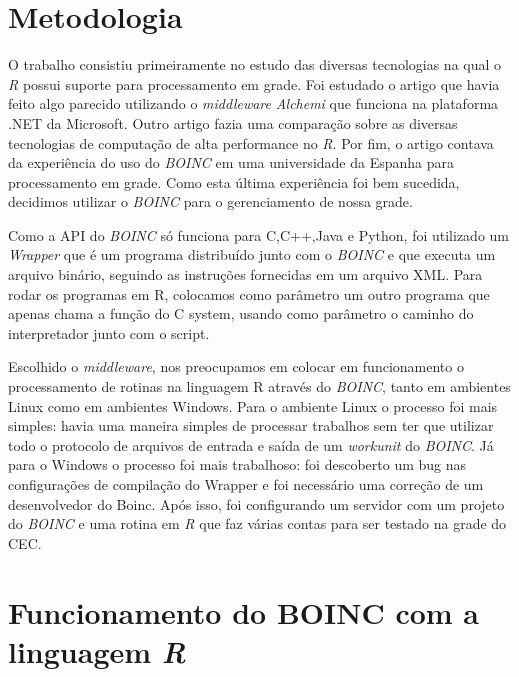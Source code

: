 \documentclass[b1,portrait]{sciposter}
\begin{document}
\begin{multicols}{2}
\section{Metodologia}

O trabalho consistiu primeiramente no estudo das diversas tecnologias na qual o \textit{R} possui suporte
para processamento em grade. Foi estudado o artigo \cite{Dias}
que havia feito algo parecido utilizando o \textit{middleware} \textit{Alchemi} que funciona na plataforma .NET
da Microsoft. Outro artigo \cite{epub8991}
fazia uma comparação sobre as diversas tecnologias de computação de alta performance no \textit{R}. Por fim, o artigo \cite{boinc}
contava da experiência do uso do \textit{BOINC} em uma universidade da Espanha para processamento em grade. Como
esta última experiência foi bem sucedida, decidimos utilizar o \textit{BOINC} para o gerenciamento de nossa grade.

Como a API do \textit{BOINC} só funciona para C,C++,Java e Python, foi utilizado um \textit{Wrapper} que é um programa distribuído junto com o 
\textit{BOINC} e que executa um arquivo binário, seguindo as instruções fornecidas em um arquivo XML. Para rodar os programas em R,
colocamos como parâmetro um outro programa que apenas chama a função do C system, usando como parâmetro o caminho 
do interpretador junto com o script. 

Escolhido o \textit{middleware}, nos preocupamos em colocar em funcionamento o processamento de rotinas na linguagem R
através do \textit{BOINC}, tanto em ambientes Linux como em ambientes Windows. Para o ambiente Linux o processo foi mais 
simples: havia uma maneira simples de processar trabalhos sem ter que utilizar todo o protocolo de arquivos de entrada e saída
de um \textit{workunit} do \textit{BOINC}. Já para o Windows o processo foi mais trabalhoso: foi descoberto um bug nas configurações 
de compilação do Wrapper e foi necessário uma correção de um desenvolvedor do Boinc. Após isso, foi configurando um servidor
com um projeto do \textit{BOINC} e uma rotina em \textit{R} que faz várias contas para ser testado na grade do CEC. 

\section{Funcionamento do BOINC com a linguagem \textit{R}}


\end{multicols}
\end{document}
